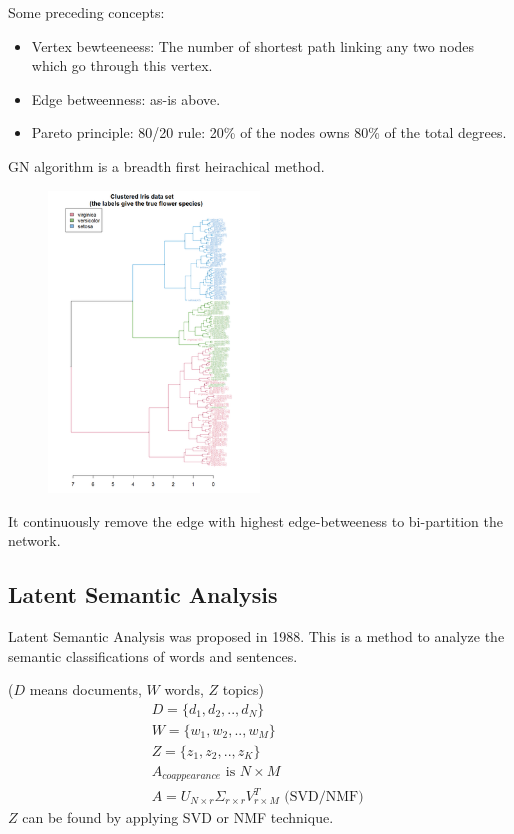 \documentclass[UTF8, 11pt, a4paper]{ctexart}
\begin{document}
Some preceding concepts:
\begin{itemize}
\item Vertex bewteeneess: The number of shortest path linking any two nodes which go through this vertex.
\item Edge betweenness: as-is above.
\item Pareto principle: 80/20 rule: 20\% of the nodes owns 80\% of the total degrees.
\end{itemize}

GN algorithm is a breadth first heirachical method.
\begin{figure}[H]
	\centering
	\includegraphics[width=0.50\textwidth]{dendrogram}
	\caption{}
\end{figure}

It continuously remove the edge with highest edge-betweeness to bi-partition the network.

\subsection{Latent Semantic Analysis}
Latent Semantic Analysis was proposed in 1988. This is a method to analyze the semantic classifications of words and sentences.

($D$ means documents, $W$ words, $Z$ topics)
\begin{eqnarray}
D=\{d_1,d_2,..,d_{N} \} \\
W=\{w_1,w_2,..,w_{M} \} \\
Z=\{ z_1,z_2,..,z_{K} \}  \\
A_{coappearance} \text{ is }  N \times M \\
A=U_{N \times r } \Sigma_{r \times r} V^{T}_{r \times M } \text{ (SVD/NMF) }
\end{eqnarray}
$Z$ can be found by applying SVD or NMF technique.
\end{document}
